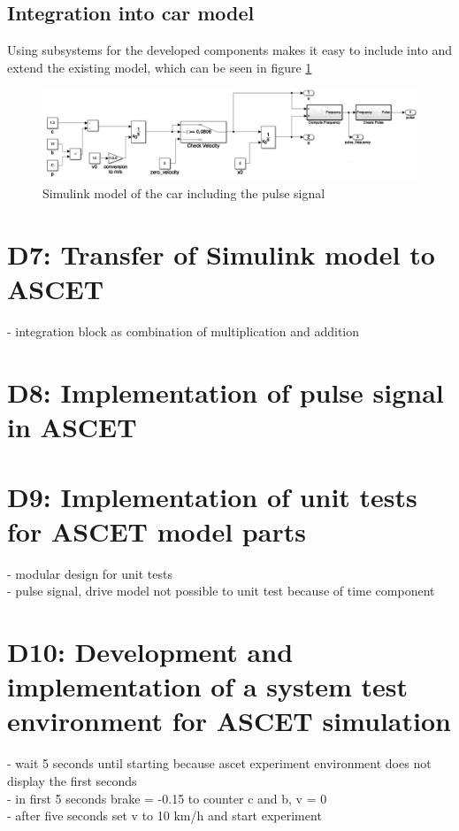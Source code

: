 \section{Integration into car model}\label{sec:D6Frequency}
Using subsystems for the developed components makes it easy to include into and extend the existing model, which can be seen in figure \ref{fig:D6_Integation}
\begin{figure}[H]
\centering
\includegraphics[width=1\textwidth]{images/D6_integration.png}
\caption{Simulink model of the car including the pulse signal}
\label{fig:D6_Integation}
\end{figure}

\chapter{D7: Transfer of Simulink model to ASCET}\label{cha:D7}
- integration block as combination of multiplication and addition

\chapter{D8: Implementation of pulse signal in ASCET}\label{cha:D8}

\chapter{D9: Implementation of unit tests for ASCET model parts}\label{cha:D9}
- modular design for unit tests \\
- pulse signal, drive model not possible to unit test because of time component

\chapter{D10: Development and implementation of a system test environment for ASCET simulation}\label{cha:D10}

- wait 5 seconds until starting because ascet experiment environment does not display the first seconds \\
- in first 5 seconds brake = -0.15 to counter c and b, v = 0 \\
- after five seconds set v to 10 km/h and start experiment

